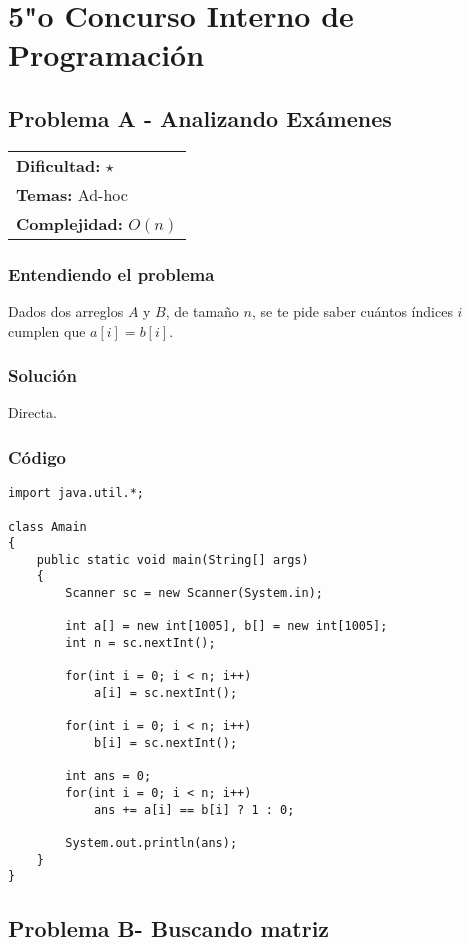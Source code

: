 \chapter{5"o Concurso Interno de Programación}

\section{Problema A - Analizando Exámenes}

\hfill
\begin{tabular}{@{}l@{}}
\textbf{Dificultad:} $\star$ \\
\textbf{Temas:} Ad-hoc \\
\textbf{Complejidad:} $O(n)$
\end{tabular}

\subsection*{Entendiendo el problema}
Dados dos arreglos $A$ y $B$, de tamaño $n$, se te pide saber cuántos índices $i$ cumplen que $a[i] = b[i]$.
\subsection*{Solución}
Directa.
\subsection*{Código}
\begin{verbatim}
import java.util.*;
 
class Amain
{
    public static void main(String[] args)
    {
        Scanner sc = new Scanner(System.in);
 
        int a[] = new int[1005], b[] = new int[1005];
        int n = sc.nextInt();
         
        for(int i = 0; i < n; i++)
            a[i] = sc.nextInt();
 
        for(int i = 0; i < n; i++)
            b[i] = sc.nextInt();
 
        int ans = 0;
        for(int i = 0; i < n; i++)
            ans += a[i] == b[i] ? 1 : 0;
 
        System.out.println(ans);
    }
}
\end{verbatim}

\section{Problema B- Buscando matriz}

